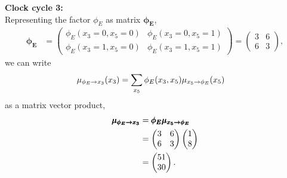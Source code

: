 \begin{exenumerate}
\begin{solution}
    { \bf Clock cycle 3:}\\
    Representing the factor $\phi_E$ as matrix $\pmb{\phi_E}$,
    \begin{align}
      \pmb{\phi_E} & = \begin{pmatrix}
        \phi_E(x_3=0,x_5=0) &  \phi_E(x_3=0,x_5=1) \\
        \phi_E(x_3=1,x_5=0) & \phi_E(x_3=1,x_5=1)  
      \end{pmatrix}
      = \begin{pmatrix}
        3 & 6 \\
        6 & 3
      \end{pmatrix},
    \end{align}
      we can write
      \begin{align}
        \fxmess{\phi_E}{x_3}{1}(x_3) & = \sum_{x_5} \phi_E(x_3,x_5) \xfmess{x_5}{\phi_E}{1}(x_5)
      \end{align}
      as a matrix vector product,
      \begin{align}
        \pmb{\mu_{{\phi_E\rightarrow x_3}}} & =  \pmb{\phi_E} \pmb{\mu_{{x_5\rightarrow \phi_E}}}\\
        & = \begin{pmatrix}
          3 & 6 \\
          6 & 3
        \end{pmatrix}
        \begin{pmatrix}
          1 \\
          8 \\
        \end{pmatrix}\\
        & =  \begin{pmatrix}
          51 \\
          30 \\
        \end{pmatrix}.
      \end{align}
      

\end{solution}
\end{exenumerate}
